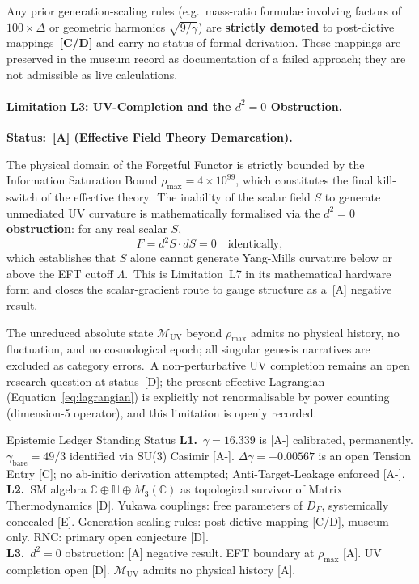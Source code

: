 Any prior generation-scaling rules (e.g.\ mass-ratio formulae involving
factors of $100 \times \Delta$ or geometric harmonics $\sqrt{9/\gamma}$)
are \textbf{strictly demoted} to post-dictive mappings~\textbf{[C/D]}
and carry no status of formal derivation. These mappings are preserved in
the museum record as documentation of a failed approach; they are not
admissible as live calculations.\Aminus

\paragraph{Limitation L3: UV-Completion and the $d^2\!=\!0$
  Obstruction.}
\textbf{Status:~[A] (Effective Field Theory Demarcation).}

The physical domain of the Forgetful Functor is strictly bounded by the
Information Saturation Bound $\rho_{\max} = 4 \times 10^{99}$, which
constitutes the final kill-switch of the effective theory.\Aclass\ The
inability of the scalar field $S$ to generate unmediated UV curvature is
mathematically formalised via the \textbf{$d^2=0$ obstruction}: for any
real scalar $S$,
\begin{equation}
  F = d^2 S \cdot dS = 0 \quad \text{identically},
  \label{eq:d2-obstruction}
\end{equation}
which establishes that $S$ alone cannot generate Yang-Mills curvature
below or above the EFT cutoff $\Lambda$.\Aclass\ This is Limitation~L7
in its mathematical hardware form and closes the scalar-gradient route to
gauge structure as a~[A] negative result.\Aclass

The unreduced absolute state $\mathcal{M}_{\text{UV}}$ beyond
$\rho_{\max}$ admits no physical history, no fluctuation, and no
cosmological epoch; all singular genesis narratives are excluded as
category errors.\Aclass\ A non-perturbative UV completion remains an
open research question at status~[D]; the present effective Lagrangian
(Equation~\ref{eq:lagrangian}) is explicitly not renormalisable by power
counting (dimension-5 operator), and this limitation is openly
recorded.\Aclass

\begin{governancebox}{Epistemic Ledger Standing Status}
  \textbf{L1.}~$\gamma = 16.339$ is [A-] calibrated, permanently.
  $\gamma_{\text{bare}} = 49/3$ identified via SU(3) Casimir [A-].
  $\Delta\gamma = +0.00567$ is an open Tension Entry [C]; no
  ab-initio derivation attempted; Anti-Target-Leakage enforced [A-].\\[0.3em]
  \textbf{L2.}~SM algebra $\mathbb{C}\oplus\mathbb{H}\oplus M_3(\mathbb{C})$
  as topological survivor of Matrix Thermodynamics [D].
  Yukawa couplings: free parameters of $D_F$, systemically concealed [E].
  Generation-scaling rules: post-dictive mapping [C/D], museum only.
  RNC: primary open conjecture [D].\\[0.3em]
  \textbf{L3.}~$d^2=0$ obstruction: [A] negative result.
  EFT boundary at $\rho_{\max}$ [A]. UV completion open [D].
  $\mathcal{M}_{\text{UV}}$ admits no physical history [A].
\end{governancebox}
